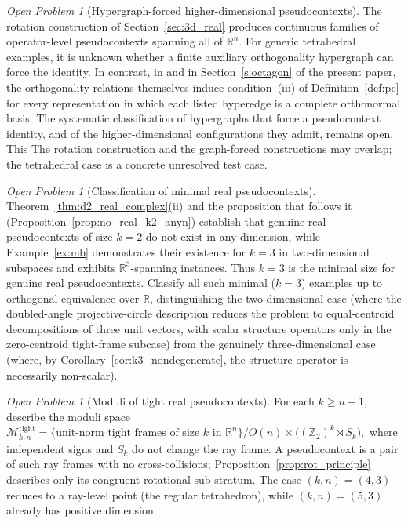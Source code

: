 \documentclass[
  twocolumn,
  aps,
  pra,
  floatfix,
  amsmath,amssymb,
  longbibliography
]{revtex4-2}
\theoremstyle{definition}
\theoremstyle{remark}
\newtheorem{problem}[theorem]{Open Problem}
\begin{document}
\begin{problem}[Hypergraph-forced higher-dimensional pseudocontexts]
The rotation construction of Section~\ref{sec:3d_real} produces continuous families of
operator-level pseudocontexts spanning all of \(\mathbb R^n\).  For generic
tetrahedral examples, it is unknown whether a finite auxiliary
orthogonality hypergraph can force the identity.
In contrast, in
\cite{2023-navara-svozil,navara-2024-e} and in
Section~\ref{s:octagon} of the present paper, the orthogonality
relations themselves induce condition~(iii) of
Definition~\ref{def:pc} for every representation in which each listed
hyperedge is a complete orthonormal basis.  The systematic classification of
hypergraphs that force a pseudocontext identity, and of the
higher-dimensional configurations they admit, remains open.  This
The rotation construction and the graph-forced constructions may overlap;
the tetrahedral case is a concrete unresolved test case.
\end{problem}

\begin{problem}[Classification of minimal real pseudocontexts]
Theorem~\ref{thm:d2_real_complex}(ii) and the proposition that follows
it (Proposition~\ref{prop:no_real_k2_anyn}) establish that genuine real
pseudocontexts of size $k=2$ do not exist in any dimension, while
Example~\ref{ex:mb} demonstrates their existence for $k=3$ in
two-dimensional subspaces and \cite{2023-navara-svozil} exhibits
$\mathbb{R}^3$-spanning instances.  Thus $k=3$ is the minimal size
for genuine real pseudocontexts.  Classify all such minimal
($k=3$) examples up to orthogonal equivalence over $\mathbb{R}$,
distinguishing the two-dimensional case (where the doubled-angle
projective-circle description reduces the problem to equal-centroid
decompositions of three unit vectors, with scalar structure operators
only in the zero-centroid tight-frame subcase) from the genuinely
three-dimensional case (where, by
Corollary~\ref{cor:k3_nondegenerate}, the structure operator is
necessarily non-scalar).
\end{problem}

\begin{problem}[Moduli of tight real pseudocontexts]
For each $k\ge n+1$, describe the moduli space
\(
  \mathcal{M}_{k,n}^{\mathrm{tight}}
  =\bigl\{\text{unit-norm tight frames of size $k$ in $\mathbb{R}^n$}\bigr\}
  \big/ O(n)\times\bigl((\mathbb Z_2)^k\rtimes S_k\bigr),
\)
where independent signs and $S_k$ do not change the ray frame.  A
pseudocontext is a pair of such ray frames with no cross-collisions;
Proposition~\ref{prop:rot_principle} describes only its congruent
rotational sub-stratum.  The case $(k,n)=(4,3)$ reduces to a ray-level
point (the regular tetrahedron), while $(k,n)=(5,3)$ already has positive
dimension.
\end{problem}
\end{document}
